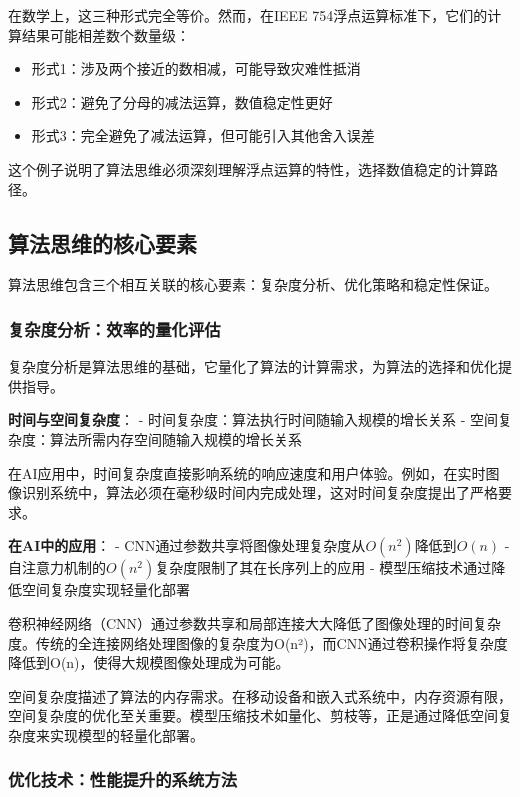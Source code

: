 在数学上，这三种形式完全等价。然而，在IEEE 754浮点运算标准下，它们的计算结果可能相差数个数量级：

\begin{itemize}
\item 形式1：涉及两个接近的数相减，可能导致灾难性抵消
\item 形式2：避免了分母的减法运算，数值稳定性更好
\item 形式3：完全避免了减法运算，但可能引入其他舍入误差
\end{itemize}

这个例子说明了算法思维必须深刻理解浮点运算的特性，选择数值稳定的计算路径。

\subsection{算法思维的核心要素}

算法思维包含三个相互关联的核心要素：复杂度分析、优化策略和稳定性保证。

\subsubsection{复杂度分析：效率的量化评估}

复杂度分析是算法思维的基础，它量化了算法的计算需求，为算法的选择和优化提供指导。

\textbf{时间与空间复杂度}：
- 时间复杂度：算法执行时间随输入规模的增长关系
- 空间复杂度：算法所需内存空间随输入规模的增长关系

在AI应用中，时间复杂度直接影响系统的响应速度和用户体验。例如，在实时图像识别系统中，算法必须在毫秒级时间内完成处理，这对时间复杂度提出了严格要求。

\textbf{在AI中的应用}：
- CNN通过参数共享将图像处理复杂度从$O(n^2)$降低到$O(n)$
- 自注意力机制的$O(n^2)$复杂度限制了其在长序列上的应用
- 模型压缩技术通过降低空间复杂度实现轻量化部署

卷积神经网络（CNN）通过参数共享和局部连接大大降低了图像处理的时间复杂度。传统的全连接网络处理图像的复杂度为O(n²)，而CNN通过卷积操作将复杂度降低到O(n)，使得大规模图像处理成为可能。

空间复杂度描述了算法的内存需求。在移动设备和嵌入式系统中，内存资源有限，空间复杂度的优化至关重要。模型压缩技术如量化、剪枝等，正是通过降低空间复杂度来实现模型的轻量化部署。

\subsubsection{优化技术：性能提升的系统方法}

